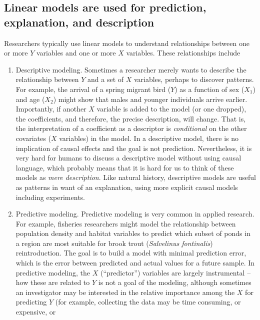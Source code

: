 \documentclass[]{book}
\theoremstyle{definition}
\theoremstyle{definition}
\theoremstyle{definition}
\theoremstyle{remark}
\begin{document}
\subsection{Linear models are used for prediction, explanation, and
description}\label{linear-models-are-used-for-prediction-explanation-and-description}

Researchers typically use linear models to understand relationships
between one or more \(Y\) variables and one or more \(X\) variables.
These relationships include

\begin{enumerate}
\def\labelenumi{\arabic{enumi}.}
\item
  Descriptive modeling. Sometimes a researcher merely wants to describe
  the relationship between \(Y\) and a set of \(X\) variables, perhaps
  to discover patterns. For example, the arrival of a spring migrant
  bird (\(Y\)) as a function of sex (\(X_1\)) and age (\(X_2\)) might
  show that males and younger individuals arrive earlier. Importantly,
  if another \(X\) variable is added to the model (or one dropped), the
  coefficients, and therefore, the precise description, will change.
  That is, the interpretation of a coefficient as a descriptor is
  \emph{conditional} on the other covariates (\(X\) variables) in the
  model. In a descriptive model, there is no implication of causal
  effects and the goal is not prediction. Nevertheless, it is very hard
  for humans to discuss a descriptive model without using causal
  language, which probably means that it is hard for us to think of
  these models as \emph{mere description}. Like natural history,
  descriptive models are useful as patterns in want of an explanation,
  using more explicit causal models including experiments.
\item
  Predictive modeling. Predictive modeling is very common in applied
  research. For example, fisheries researchers might model the
  relationship between population density and habitat variables to
  predict which subset of ponds in a region are most suitable for brook
  trout (\emph{Salvelinus fontinalis}) reintroduction. The goal is to
  build a model with minimal prediction error, which is the error
  between predicted and actual values for a future sample. In predictive
  modeling, the \(X\) (``predictor'') variables are largely instrumental
  -- how these are related to \(Y\) is not a goal of the modeling,
  although sometimes an investigator may be interested in the relative
  importance among the \(X\) for predicting \(Y\) (for example,
  collecting the data may be time consuming, or expensive, or

\end{enumerate}
\end{document}
